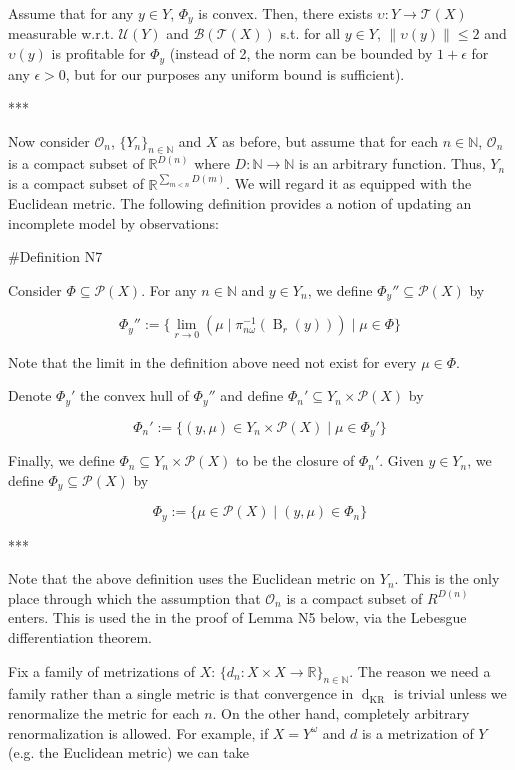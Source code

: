 \documentclass[a4paper]{article}
\newcommand{\Nats}{\mathbb{N}}
\newcommand{\Reals}{\mathbb{R}}
\newcommand{\Norm}[1]{\lVert #1 \rVert}
\newcommand{\Prob}{\mathcal{P}}
\newcommand{\Ob}{\mathcal{O}}
\newcommand{\T}{\mathcal{T}}
\newcommand{\B}{\mathcal{B}}
\newcommand{\UM}{\mathcal{U}}
\newcommand{\Dkr}{\operatorname{d}_{\text{KR}}}
\newcommand{\Ball}{\operatorname{B}}
\begin{document}
Assume that for any ${y \in Y}$, ${\Phi_y}$ is convex. Then, there exists ${\upsilon: Y \rightarrow \T(X)}$ measurable w.r.t. ${\UM(Y)}$ and ${\B(\T(X))}$ s.t. for all ${y \in Y}$, ${\Norm{\upsilon(y)} \leq 2}$ and ${\upsilon(y)}$ is profitable for ${\Phi_y}$ (instead of 2, the norm can be bounded by ${1+\epsilon}$ for any ${\epsilon > 0}$, but for our purposes any uniform bound is sufficient).

***

Now consider ${\Ob_n}$, ${\{Y_n\}_{n \in \Nats}}$ and $X$ as before, but assume that for each ${n \in \Nats}$, ${\Ob_n}$ is a compact subset of ${\Reals^{D(n)}}$ where ${D: \Nats \rightarrow \Nats}$ is an arbitrary function. Thus, ${Y_n}$ is a compact subset of ${\Reals^{\sum_{m < n} D(m)}}$. We will regard it as equipped with the Euclidean metric. The following definition provides a notion of updating an incomplete model by observations:

\#Definition N7

Consider ${\Phi \subseteq \Prob(X)}$. For any ${n \in \Nats}$ and ${y \in Y_n}$, we define ${\Phi_y'' \subseteq \Prob(X)}$ by

$$\Phi_y'':=\{\lim_{r \rightarrow 0} (\mu \mid \pi_{n\omega}^{-1}(\Ball_r(y))) \mid \mu \in \Phi\}$$

Note that the limit in the definition above need not exist for every ${\mu \in \Phi}$.

Denote ${\Phi_y'}$ the convex hull of ${\Phi_y''}$ and define ${\Phi_n' \subseteq Y_n \times \Prob(X)}$ by

$$\Phi_n':=\{(y,\mu) \in Y_n \times \Prob(X) \mid \mu \in \Phi_y'\}$$

Finally, we define ${\Phi_n \subseteq Y_n \times \Prob(X)}$ to be the closure of ${\Phi_n'}$. Given ${y \in Y_n}$, we define ${\Phi_y \subseteq \Prob(X)}$ by

$$\Phi_y:=\{\mu \in \Prob(X) \mid (y,\mu) \in \Phi_n\}$$

***

Note that the above definition uses the Euclidean metric on ${Y_n}$. This is the only place through which the assumption that ${\Ob_n}$ is a compact subset of ${R^{D(n)}}$ enters. This is used the in the proof of Lemma N5 below, via the Lebesgue differentiation theorem.

Fix a family of metrizations of ${X}$: ${\{d_n: X \times X \rightarrow \Reals\}_{n \in \Nats}}$. The reason we need a family rather than a single metric is that convergence in ${\Dkr}$ is trivial unless we renormalize the metric for each ${n}$. On the other hand, completely arbitrary renormalization is allowed. For example, if ${X=Y^\omega}$ and ${d}$ is a metrization of ${Y}$ (e.g. the Euclidean metric) we can take 
\end{document}
